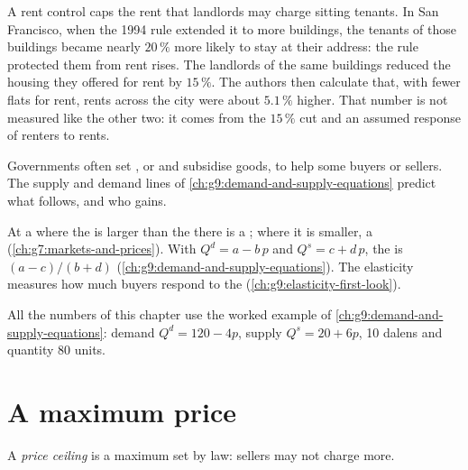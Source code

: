 A rent control caps the rent that landlords may charge sitting tenants. In San Francisco, when the 1994
rule extended it to more buildings, the tenants of those buildings became nearly $20\,\%$ more likely to
stay at their address: the rule protected them from rent rises. The landlords of the same buildings
reduced the housing they offered for rent by $15\,\%$. The authors then calculate that, with fewer flats
for rent, rents across the city were about $5.1\,\%$ higher. That number is not measured like the
other two: it comes from the $15\,\%$ cut and an assumed response of renters to rents.

Governments often set , or  and subsidise goods, to help some buyers or sellers. The supply and
demand lines of \cref{ch:g9:demand-and-supply-equations} predict what follows, and who gains.

\begin{recall}
At a  where the  is larger than the  there is a ; where
it is smaller, a  (\cref{ch:g7:markets-and-prices}). With $Q^d = a - b\,p$ and $Q^s = c + d\,p$,
the  is $(a - c)/(b + d)$ (\cref{ch:g9:demand-and-supply-equations}). The elasticity
measures how much buyers respond to the  (\cref{ch:g9:elasticity-first-look}).
\end{recall}

All the numbers of this chapter use the worked example of
\cref{ch:g9:demand-and-supply-equations}: demand $Q^d = 120 - 4p$, supply $Q^s = 20 + 6p$,  10 dalens and quantity 80 units.

\section{A maximum price}

\begin{definition}\label{def:g9:price-controls-taxes-subsidies:price-ceiling}
A \emph{price ceiling} is a maximum  set by law: sellers may not charge
more.
\end{definition}

